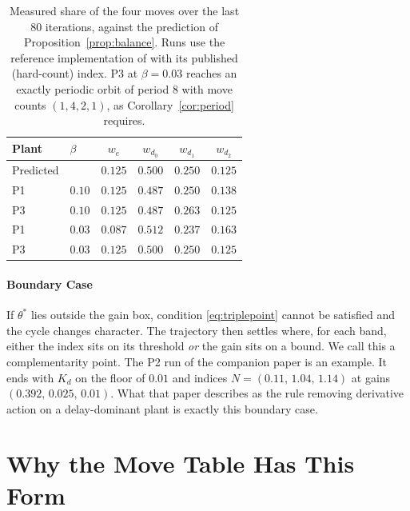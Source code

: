 \documentclass[letterpaper, 10pt, conference, twocolumn]{ieeeconf}
\begin{document}
\begin{table}[t]
\small
\centering
\caption{Measured share of the four moves over the last $80$ iterations,
against the prediction of Proposition~\ref{prop:balance}. Runs use the
reference implementation of \cite{Paper1} with its published (hard-count)
index. P3 at $\beta = 0.03$ reaches an exactly periodic orbit of period $8$
with move counts $(1,4,2,1)$, as Corollary~\ref{cor:period} requires.
}
\label{tab:duty}
\begin{tabular}{llcccc}
\toprule
Plant & $\beta$ & $w_e$ & $w_{d_0}$ & $w_{d_1}$ & $w_{d_2}$ \\
\midrule
Predicted &      & $0.125$ & $0.500$ & $0.250$ & $0.125$ \\
\midrule
P1 & $0.10$ & $0.125$ & $0.487$ & $0.250$ & $0.138$ \\
P3 & $0.10$ & $0.125$ & $0.487$ & $0.263$ & $0.125$ \\
P1 & $0.03$ & $0.087$ & $0.512$ & $0.237$ & $0.163$ \\
P3 & $0.03$ & $0.125$ & $0.500$ & $0.250$ & $0.125$ \\
\bottomrule
\end{tabular}
\end{table}

\paragraph{Boundary Case} If $\theta^*$ lies outside the gain box, condition
\eqref{eq:triplepoint} cannot be satisfied and the cycle changes character.
The trajectory then settles where, for each band, either the index sits on its
threshold \emph{or} the gain sits on a bound. We call this a complementarity
point. The P2 run of the companion paper is an example. It ends with $K_d$ on
the floor of $0.01$ and indices $N = (0.11,\, 1.04,\, 1.14)$ at gains
$(0.392,\, 0.025,\, 0.01)$. What that paper describes as the rule removing
derivative action on a delay-dominant plant is exactly this boundary case.

\section{Why the Move Table Has This Form}
\label{sec:why}
\end{document}
